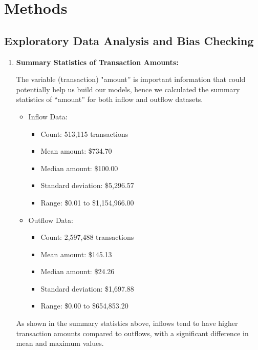 \documentclass[12pt,letterpaper]{article}
\begin{document}
\section{Methods}
\subsection{Exploratory Data Analysis and Bias Checking}
\begin{enumerate}
    \item{\textbf{Summary Statistics of Transaction Amounts:}
    
    The variable (transaction) "amount” is important information that could potentially help us build our models, hence we calculated the summary statistics of “amount” for both inflow and outflow datasets.}
    \begin{itemize}
        \item {Inflow Data:}
            \begin{itemize}
                \item{Count: 513,115 transactions}
                \item{Mean amount: \$734.70}
                \item{Median amount: \$100.00}
                \item{Standard deviation: \$5,296.57}
                \item{Range: \$0.01 to \$1,154,966.00}
            \end{itemize}
    
        \item {Outflow Data:}
            \begin{itemize}
                \item{Count: 2,597,488 transactions}
                \item{Mean amount: \$145.13}
                \item{Median amount: \$24.26}
                \item{Standard deviation: \$1,697.88}
                \item{Range: \$0.00 to \$654,853.20}
            \end{itemize}
    \end{itemize}
{As shown in the summary statistics above,  inflows tend to have higher transaction amounts compared to outflows, with a significant difference in mean and maximum values.}


\end{enumerate}
\end{document}
